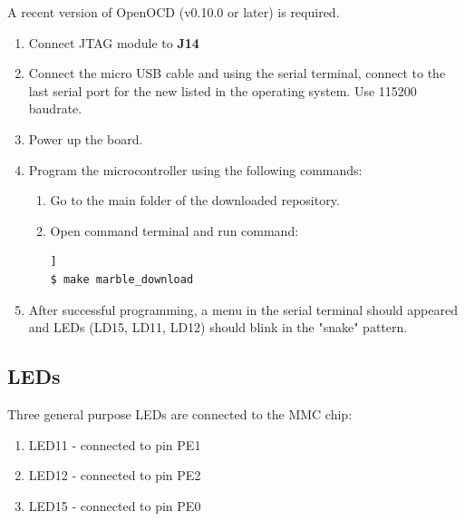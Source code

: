 \documentclass[12pt,oneside,a4]{article}
\begin{document}
A recent version of OpenOCD (v0.10.0 or later) is required.
\begin{enumerate}
	\item Connect JTAG module to \textbf{J14}
	\item Connect the micro USB cable and using the serial terminal, connect to the last serial port for the new listed in the operating system. Use 115200 baudrate.
	\item Power up the board.
	\item Program the microcontroller using the following commands:
	\begin{enumerate}
	\item Go to the main folder of the downloaded repository.
	\item Open command terminal and run command:
	\begin{lstlisting}[backgroundcolor = \color{Gainsboro}, language=bash, frame=none]]
$ make marble_download
	\end{lstlisting}
	\end{enumerate}
	\item After successful programming, a menu in the serial terminal should appeared and LEDs (LD15, LD11, LD12) should blink in the "snake" pattern.
\end{enumerate}
\subsection{LEDs}
Three general purpose LEDs are connected to the MMC chip:
\begin{enumerate}
	\item LED11 - connected to pin PE1
	\item LED12 - connected to pin PE2
	\item LED15 - connected to pin PE0
\end{enumerate}
\end{document}
